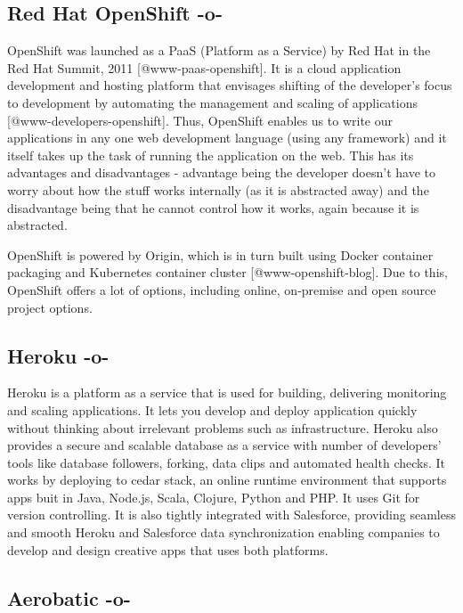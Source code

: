 \subsection{Red Hat OpenShift -o-}

OpenShift was launched as a PaaS (Platform as a Service) by Red Hat in
the Red Hat Summit, 2011 [@www-paas-openshift].  It is a cloud
application development and hosting platform that envisages shifting
of the developer's focus to development by automating the management
and scaling of applications [@www-developers-openshift].  Thus,
OpenShift enables us to write our applications in any one web
development language (using any framework) and it itself takes up the
task of running the application on the web\cite{www-openshift}.  This
has its advantages and disadvantages - advantage being the developer
doesn't have to worry about how the stuff works internally (as it is
abstracted away) and the disadvantage being that he cannot control how
it works, again because it is abstracted.

OpenShift is powered by Origin, which is in turn built using Docker
container packaging and Kubernetes container
cluster [@www-openshift-blog].  Due to this, OpenShift offers a
lot of options, including online, on-premise and open source project
options.


    
\subsection{Heroku -o-}

Heroku is a platform as a service that is used for building,
delivering monitoring and scaling applications\cite{www-Heroku}. It
lets you develop and deploy application quickly without thinking about
irrelevant problems such as infrastructure. Heroku also provides a
secure and scalable database as a service with number of developers'
tools like database followers, forking, data clips and automated
health checks. It works by deploying to cedar stack, an online runtime
environment that supports apps buit in Java, Node.js, Scala, Clojure,
Python and PHP\cite{www-cedar}. It uses Git for version
controlling. It is also tightly integrated with Salesforce, providing
seamless and smooth Heroku and Salesforce data synchronization
enabling companies to develop and design creative apps that uses both
platforms.



\subsection{Aerobatic -o-}

